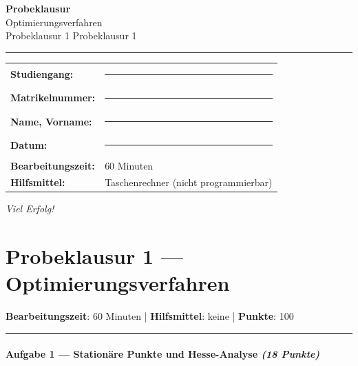 \documentclass[11pt, a4paper]{article}
\providecommand{\nichttitle}{Probeklausur}
\providecommand{\nichtsubtitle}{}
\renewcommand{\nichttitle}{Optimierungsverfahren}
\renewcommand{\nichtsubtitle}{Probeklausur 1}
\begin{document}
\thispagestyle{empty}
\begin{center}
\vspace*{1cm}
{\Huge\bfseries\color{accent}Probeklausur}\\[8pt]
{\Large\color{accent}\nichttitle}\\[4pt]
\ifx\nichtsubtitle\empty\else
  {\large\color{accent!80!black}\nichtsubtitle}\\[6pt]
\fi
\color{accent}\rule{0.5\linewidth}{1pt}\color{black}
\end{center}

\vspace{1cm}
\begin{tabularx}{\textwidth}{@{}l X@{}}
\textbf{Studiengang:}      & \rule{6cm}{0.4pt} \\[6pt]
\textbf{Matrikelnummer:}    & \rule{6cm}{0.4pt} \\[6pt]
\textbf{Name, Vorname:}    & \rule{6cm}{0.4pt} \\[6pt]
\textbf{Datum:}             & \rule{6cm}{0.4pt} \\[6pt]
\textbf{Bearbeitungszeit:}  & 60 Minuten \\[6pt]
\textbf{Hilfsmittel:}       & Taschenrechner (nicht programmierbar) \\
\end{tabularx}

\vspace{2cm}
\begin{center}
{\large\itshape Viel Erfolg!}
\end{center}

\newpage


\section{Probeklausur 1 — Optimierungsverfahren}

\textbf{Bearbeitungszeit}: 60 Minuten | \textbf{Hilfsmittel}: keine | \textbf{Punkte}: 100



\noindent\textcolor{rulegray}{\rule{\linewidth}{0.4pt}}


\paragraph{Aufgabe 1 — Stationäre Punkte und Hesse-Analyse \textit{(18 Punkte)}}\mbox{}\\[2pt]
\end{document}
